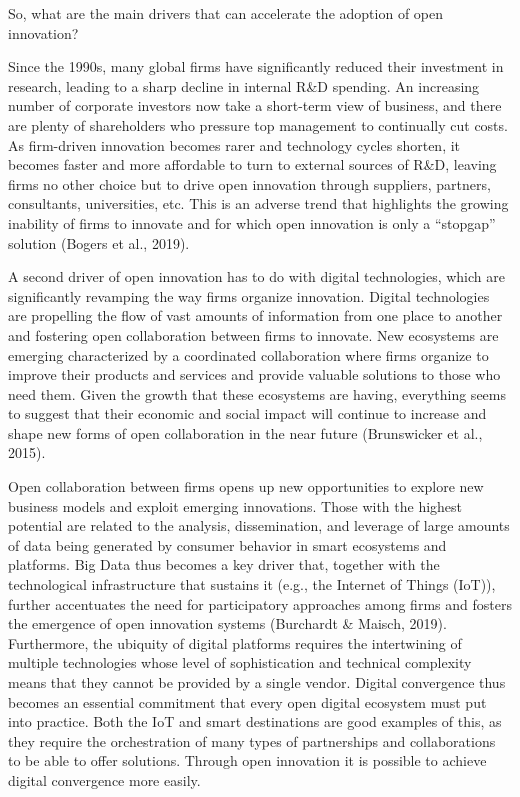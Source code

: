 \documentclass[
  letterpaper,
  DIV=11,
  numbers=noendperiod]{scrreprt}
\begin{document}
So, what are the main drivers that can accelerate the adoption of open
innovation?

Since the 1990s, many global firms have significantly reduced their
investment in research, leading to a sharp decline in internal R\&D
spending. An increasing number of corporate investors now take a
short-term view of business, and there are plenty of shareholders who
pressure top management to continually cut costs. As firm-driven
innovation becomes rarer and technology cycles shorten, it becomes
faster and more affordable to turn to external sources of R\&D, leaving
firms no other choice but to drive open innovation through suppliers,
partners, consultants, universities, etc. This is an adverse trend that
highlights the growing inability of firms to innovate and for which open
innovation is only a ``stopgap'' solution (Bogers et al., 2019).

A second driver of open innovation has to do with digital technologies,
which are significantly revamping the way firms organize innovation.
Digital technologies are propelling the flow of vast amounts of
information from one place to another and fostering open collaboration
between firms to innovate. New ecosystems are emerging characterized by
a coordinated collaboration where firms organize to improve their
products and services and provide valuable solutions to those who need
them. Given the growth that these ecosystems are having, everything
seems to suggest that their economic and social impact will continue to
increase and shape new forms of open collaboration in the near future
(Brunswicker et al., 2015).

Open collaboration between firms opens up new opportunities to explore
new business models and exploit emerging innovations. Those with the
highest potential are related to the analysis, dissemination, and
leverage of large amounts of data being generated by consumer behavior
in smart ecosystems and platforms. Big Data thus becomes a key driver
that, together with the technological infrastructure that sustains it
(e.g., the Internet of Things (IoT)), further accentuates the need for
participatory approaches among firms and fosters the emergence of open
innovation systems (Burchardt \& Maisch, 2019). Furthermore, the
ubiquity of digital platforms requires the intertwining of multiple
technologies whose level of sophistication and technical complexity
means that they cannot be provided by a single vendor. Digital
convergence thus becomes an essential commitment that every open digital
ecosystem must put into practice. Both the IoT and smart destinations
are good examples of this, as they require the orchestration of many
types of partnerships and collaborations to be able to offer solutions.
Through open innovation it is possible to achieve digital convergence
more easily.
\end{document}

